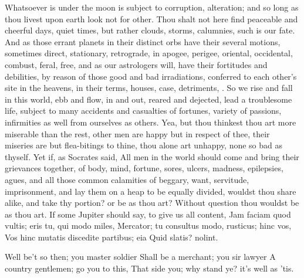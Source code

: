 {Whatsoever is under the moon is subject to corruption, alteration; and
so long as thou livest upon earth look not for other. Thou shalt
not here find peaceable and cheerful days, quiet times, but rather
clouds, storms, calumnies, such is our fate. And as those errant
planets in their distinct orbs have their several motions, sometimes
direct, stationary, retrograde, in apogee, perigee, oriental,
occidental, combust, feral, free, and as our astrologers will, have
their fortitudes and debilities, by reason of those good and bad
irradiations, conferred to each other's site in the heavens, in their
terms, houses, case, detriments, \etc{}. So we rise and fall in this world,
ebb and flow, in and out, reared and dejected, lead a troublesome life,
subject to many accidents and casualties of fortunes, variety of
passions, infirmities as well from ourselves as others.
Yea, but thou thinkest thou art more miserable than the rest, other men
are happy but in respect of thee, their miseries are but flea-bitings
to thine, thou alone art unhappy, none so bad as thyself. Yet if, as
Socrates said, All men in the world should come and bring their
grievances together, of body, mind, fortune, sores, ulcers, madness,
epilepsies, agues, and all those common calamities of beggary, want,
servitude, imprisonment, and lay them on a heap to be equally divided,
wouldst thou share alike, and take thy portion? or be as thou art?
Without question thou wouldst be as thou art. If some Jupiter should
say, to give us all content,
Jam faciam quod vultis; eris tu, qui modo miles,
Mercator; tu consultus modo, rusticus; hinc vos,
Vos hinc mutatis discedite partibus; eia
Quid slatis? nolint.

Well be't so then; you master soldier
Shall be a merchant; you sir lawyer
A country gentlemen; go you to this,
That side you; why stand ye? it's well as 'tis.

}
